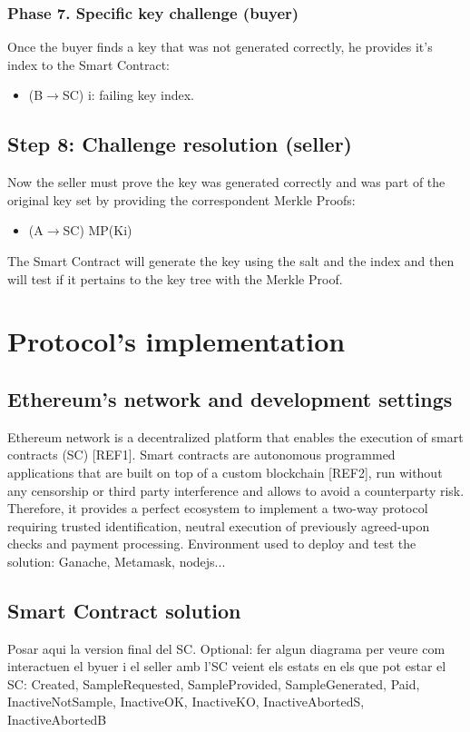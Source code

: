 \documentclass[]{article}
\begin{document}
\subsubsection{Phase 7. Specific key challenge (buyer)}
Once the buyer finds a key that was not generated correctly, he provides it's index to the Smart Contract:
\begin{itemize}
	\item (B$\rightarrow$SC) i: failing key index.
\end{itemize}

\subsection{Step 8: Challenge resolution (seller)}
Now the seller must prove the key was generated correctly and was part of the original key set by providing the correspondent Merkle Proofs:
\begin{itemize}
	\item (A$\rightarrow$SC) MP(Ki)
\end{itemize}
The Smart Contract will generate the key using the salt and the index and then will test if it pertains to the key tree with the Merkle Proof. 

\section{Protocol's implementation}
\subsection{Ethereum's network and development settings}
Ethereum network is a decentralized platform that enables the execution of smart contracts (SC) [REF1]. Smart contracts are autonomous programmed applications that are built on top of a custom blockchain [REF2], run without any censorship or third party interference and allows to avoid a counterparty risk. Therefore, it provides a perfect ecosystem to implement a two-way protocol requiring trusted identification, neutral execution of previously agreed-upon checks and payment processing.
Environment used to deploy and test the solution: Ganache, Metamask, nodejs...
\subsection{Smart Contract solution}
Posar aqui la version final del SC. Optional: fer algun diagrama per veure com interactuen el byuer i el seller amb l'SC veient els estats en els que pot estar el SC: Created, SampleRequested, SampleProvided, SampleGenerated, Paid, InactiveNotSample, InactiveOK, InactiveKO, InactiveAbortedS, InactiveAbortedB
\end{document}
